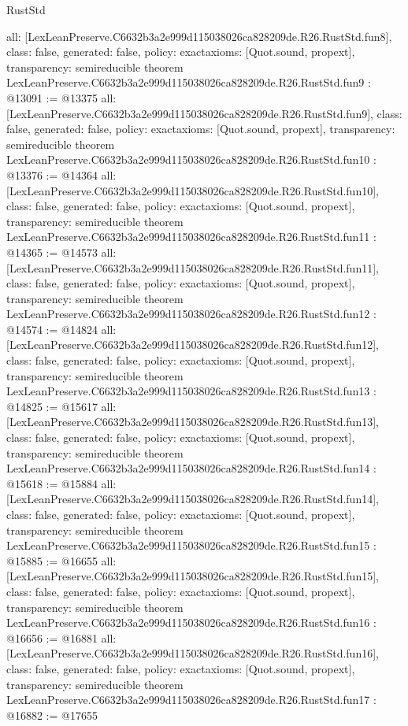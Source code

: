 \begin{lexlean}{RustStd}
\begin{coremodule}
{  all: [LexLeanPreserve.C6632b3a2e999d115038026ca828209de.R26.RustStd.fun8],
  class: false,
  generated: false,
  policy: exact{axioms: [Quot.sound, propext]},
  transparency: semireducible
}
theorem LexLeanPreserve.C6632b3a2e999d115038026ca828209de.R26.RustStd.fun9 : @13091 := @13375 {
  all: [LexLeanPreserve.C6632b3a2e999d115038026ca828209de.R26.RustStd.fun9],
  class: false,
  generated: false,
  policy: exact{axioms: [Quot.sound, propext]},
  transparency: semireducible
}
theorem LexLeanPreserve.C6632b3a2e999d115038026ca828209de.R26.RustStd.fun10 : @13376 := @14364 {
  all: [LexLeanPreserve.C6632b3a2e999d115038026ca828209de.R26.RustStd.fun10],
  class: false,
  generated: false,
  policy: exact{axioms: [Quot.sound, propext]},
  transparency: semireducible
}
theorem LexLeanPreserve.C6632b3a2e999d115038026ca828209de.R26.RustStd.fun11 : @14365 := @14573 {
  all: [LexLeanPreserve.C6632b3a2e999d115038026ca828209de.R26.RustStd.fun11],
  class: false,
  generated: false,
  policy: exact{axioms: [Quot.sound, propext]},
  transparency: semireducible
}
theorem LexLeanPreserve.C6632b3a2e999d115038026ca828209de.R26.RustStd.fun12 : @14574 := @14824 {
  all: [LexLeanPreserve.C6632b3a2e999d115038026ca828209de.R26.RustStd.fun12],
  class: false,
  generated: false,
  policy: exact{axioms: [Quot.sound, propext]},
  transparency: semireducible
}
theorem LexLeanPreserve.C6632b3a2e999d115038026ca828209de.R26.RustStd.fun13 : @14825 := @15617 {
  all: [LexLeanPreserve.C6632b3a2e999d115038026ca828209de.R26.RustStd.fun13],
  class: false,
  generated: false,
  policy: exact{axioms: [Quot.sound, propext]},
  transparency: semireducible
}
theorem LexLeanPreserve.C6632b3a2e999d115038026ca828209de.R26.RustStd.fun14 : @15618 := @15884 {
  all: [LexLeanPreserve.C6632b3a2e999d115038026ca828209de.R26.RustStd.fun14],
  class: false,
  generated: false,
  policy: exact{axioms: [Quot.sound, propext]},
  transparency: semireducible
}
theorem LexLeanPreserve.C6632b3a2e999d115038026ca828209de.R26.RustStd.fun15 : @15885 := @16655 {
  all: [LexLeanPreserve.C6632b3a2e999d115038026ca828209de.R26.RustStd.fun15],
  class: false,
  generated: false,
  policy: exact{axioms: [Quot.sound, propext]},
  transparency: semireducible
}
theorem LexLeanPreserve.C6632b3a2e999d115038026ca828209de.R26.RustStd.fun16 : @16656 := @16881 {
  all: [LexLeanPreserve.C6632b3a2e999d115038026ca828209de.R26.RustStd.fun16],
  class: false,
  generated: false,
  policy: exact{axioms: [Quot.sound, propext]},
  transparency: semireducible
}
theorem LexLeanPreserve.C6632b3a2e999d115038026ca828209de.R26.RustStd.fun17 : @16882 := @17655 {
}
\end{coremodule}
\end{lexlean}
